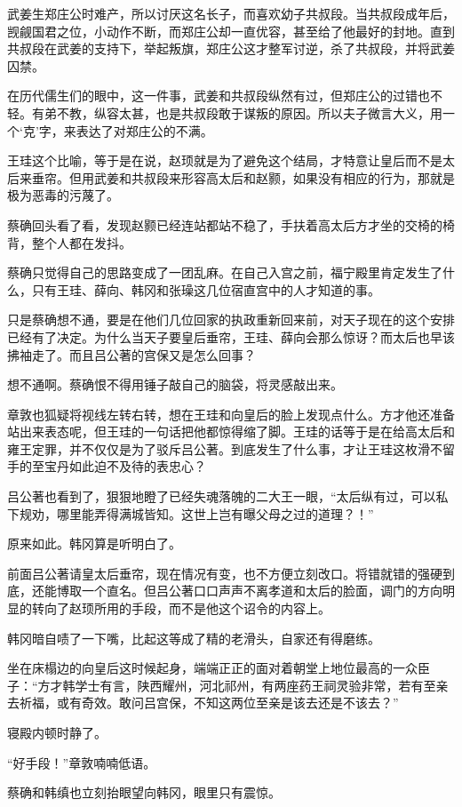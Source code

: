 武姜生郑庄公时难产，所以讨厌这名长子，而喜欢幼子共叔段。当共叔段成年后，觊觎国君之位，小动作不断，而郑庄公却一直优容，甚至给了他最好的封地。直到共叔段在武姜的支持下，举起叛旗，郑庄公这才整军讨逆，杀了共叔段，并将武姜囚禁。

在历代儒生们的眼中，这一件事，武姜和共叔段纵然有过，但郑庄公的过错也不轻。有弟不教，纵容太甚，也是共叔段敢于谋叛的原因。所以夫子微言大义，用一个‘克’字，来表达了对郑庄公的不满。

王珪这个比喻，等于是在说，赵顼就是为了避免这个结局，才特意让皇后而不是太后来垂帘。但用武姜和共叔段来形容高太后和赵颢，如果没有相应的行为，那就是极为恶毒的污蔑了。

蔡确回头看了看，发现赵颢已经连站都站不稳了，手扶着高太后方才坐的交椅的椅背，整个人都在发抖。

蔡确只觉得自己的思路变成了一团乱麻。在自己入宫之前，福宁殿里肯定发生了什么，只有王珪、薛向、韩冈和张璪这几位宿直宫中的人才知道的事。

只是蔡确想不通，要是在他们几位回家的执政重新回来前，对天子现在的这个安排已经有了决定。为什么当天子要皇后垂帘，王珪、薛向会那么惊讶？而太后也早该拂袖走了。而且吕公著的宫保又是怎么回事？

想不通啊。蔡确恨不得用锤子敲自己的脑袋，将灵感敲出来。

章敦也狐疑将视线左转右转，想在王珪和向皇后的脸上发现点什么。方才他还准备站出来表态呢，但王珪的一句话把他都惊得缩了脚。王珪的话等于是在给高太后和雍王定罪，并不仅仅是为了驳斥吕公著。到底发生了什么事，才让王珪这枚滑不留手的至宝丹如此迫不及待的表忠心？

吕公著也看到了，狠狠地瞪了已经失魂落魄的二大王一眼，“太后纵有过，可以私下规劝，哪里能弄得满城皆知。这世上岂有曝父母之过的道理？！”

原来如此。韩冈算是听明白了。

前面吕公著请皇太后垂帘，现在情况有变，也不方便立刻改口。将错就错的强硬到底，还能博取一个直名。但吕公著口口声声不离孝道和太后的脸面，调门的方向明显的转向了赵顼所用的手段，而不是他这个诏令的内容上。

韩冈暗自啧了一下嘴，比起这等成了精的老滑头，自家还有得磨练。

坐在床榻边的向皇后这时候起身，端端正正的面对着朝堂上地位最高的一众臣子：“方才韩学士有言，陕西耀州，河北祁州，有两座药王祠灵验非常，若有至亲去祈福，或有奇效。敢问吕宫保，不知这两位至亲是该去还是不该去？”

寝殿内顿时静了。

“好手段！”章敦喃喃低语。

蔡确和韩缜也立刻抬眼望向韩冈，眼里只有震惊。

